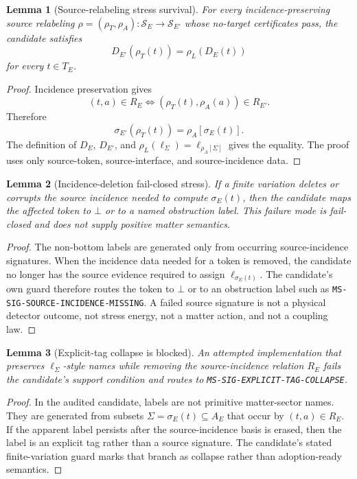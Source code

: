\documentclass[11pt]{article}
\newcommand{\Bottom}{\bot}
\newtheorem{lemma}{Lemma}
\begin{document}
\begin{lemma}[Source-relabeling stress survival]
For every incidence-preserving source relabeling
\(\rho=(\rho_T,\rho_A):\mathcal{S}_E\to\mathcal{S}_{E'}\) whose no-target
certificates pass, the candidate satisfies
\[
  D_{E'}(\rho_T(t))=\rho_L(D_E(t))
\]
for every \(t\in T_E\).
\end{lemma}

\begin{proof}
Incidence preservation gives
\[
  (t,a)\in R_E \Longleftrightarrow
  (\rho_T(t),\rho_A(a))\in R_{E'}.
\]
Therefore
\[
  \sigma_{E'}(\rho_T(t))=\rho_A[\sigma_E(t)].
\]
The definition of \(D_E\), \(D_{E'}\), and
\(\rho_L(\ell_\Sigma)=\ell_{\rho_A[\Sigma]}\) gives the equality. The proof
uses only source-token, source-interface, and source-incidence data.
\end{proof}

\begin{lemma}[Incidence-deletion fail-closed stress]
If a finite variation deletes or corrupts the source incidence needed to
compute \(\sigma_E(t)\), then the candidate maps the affected token to
\(\Bottom\) or to a named obstruction label. This failure mode is fail-closed
and does not supply positive matter semantics.
\end{lemma}

\begin{proof}
The non-bottom labels are generated only from occurring source-incidence
signatures. When the incidence data needed for a token is removed, the
candidate no longer has the source evidence required to assign
\(\ell_{\sigma_E(t)}\). The candidate's own guard therefore routes the token
to \(\Bottom\) or to an obstruction label such as
\texttt{MS-SIG-SOURCE-INCIDENCE-MISSING}. A failed source signature is not a
physical detector outcome, not stress energy, not a matter action, and not a
coupling law.
\end{proof}

\begin{lemma}[Explicit-tag collapse is blocked]
An attempted implementation that preserves \(\ell_\Sigma\)-style names while
removing the source-incidence relation \(R_E\) fails the candidate's support
condition and routes to \texttt{MS-SIG-EXPLICIT-TAG-COLLAPSE}.
\end{lemma}

\begin{proof}
In the audited candidate, labels are not primitive matter-sector names. They
are generated from subsets \(\Sigma=\sigma_E(t)\subseteq A_E\) that occur by
\((t,a)\in R_E\). If the apparent label persists after the source-incidence
basis is erased, then the label is an explicit tag rather than a source
signature. The candidate's stated finite-variation guard marks that branch as
collapse rather than adoption-ready semantics.
\end{proof}
\end{document}
